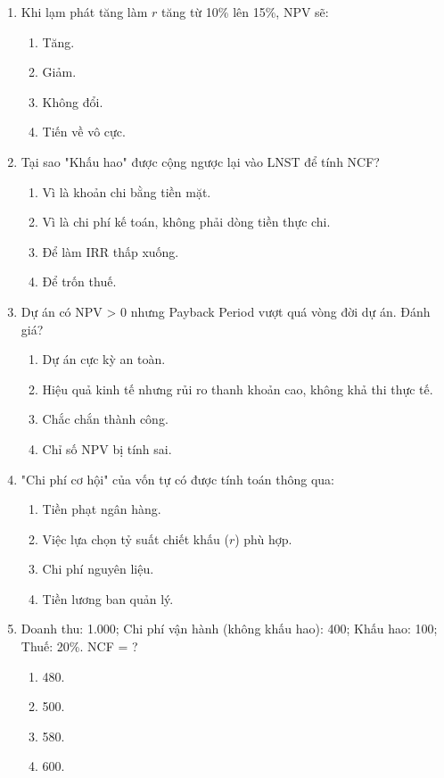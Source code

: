 \begin{enumerate}[label=\textbf{Câu \arabic*:}, leftmargin=*, resume]
\item Khi lạm phát tăng làm $r$ tăng từ 10\% lên 15\%, NPV sẽ:
\begin{enumerate}[label=\Alph*.]
    \item Tăng. \item Giảm. \item Không đổi. \item Tiến về vô cực.
\end{enumerate}

\item Tại sao "Khấu hao" được cộng ngược lại vào LNST để tính NCF?
\begin{enumerate}[label=\Alph*.]
    \item Vì là khoản chi bằng tiền mặt.
    \item Vì là chi phí kế toán, không phải dòng tiền thực chi.
    \item Để làm IRR thấp xuống.
    \item Để trốn thuế.
\end{enumerate}

\item Dự án có NPV > 0 nhưng Payback Period vượt quá vòng đời dự án. Đánh giá?
\begin{enumerate}[label=\Alph*.]
    \item Dự án cực kỳ an toàn.
    \item Hiệu quả kinh tế nhưng rủi ro thanh khoản cao, không khả thi thực tế.
    \item Chắc chắn thành công.
    \item Chỉ số NPV bị tính sai.
\end{enumerate}

\item "Chi phí cơ hội" của vốn tự có được tính toán thông qua:
\begin{enumerate}[label=\Alph*.]
    \item Tiền phạt ngân hàng.
    \item Việc lựa chọn tỷ suất chiết khấu ($r$) phù hợp.
    \item Chi phí nguyên liệu.
    \item Tiền lương ban quản lý.
\end{enumerate}

\item Doanh thu: 1.000; Chi phí vận hành (không khấu hao): 400; Khấu hao: 100; Thuế: 20\%. NCF = ?
\begin{enumerate}[label=\Alph*.]
    \item 480. \item 500. \item 580. \item 600.
\end{enumerate}


\end{enumerate}
